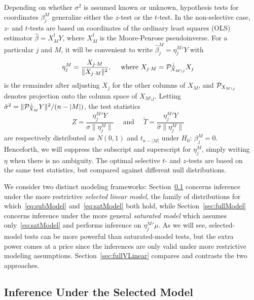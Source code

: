 \documentclass{article}
\theoremstyle{definition}
\newcommand{\bX}{X}
\newcommand{\proj}{\cP}
\begin{document}
Depending on whether $\sigma^2$ is assumed known or unknown, hypothesis tests for coordinates $\beta_j^{M}$ generalize either the $z$-test or the $t$-test. In the non-selective case, $z$- and $t$-tests are based on coordinates of the ordinary least squares (OLS) estimator $\hat\beta = \bX_M^\dagger Y$, where  $\bX_M^\dagger$ is the Moore-Penrose pseudoinverse. For a particular $j$ and $M$, it will be convenient to write $\hat\beta_j^M = {\eta_j^M}'Y$ with
\begin{equation}
  {\eta_j^M}= \frac{X_{j\cdot M}}{\|X_{j\cdot M}\|^2}, \quad \text{ where } X_{j\cdot M} = \proj_{\bX_{M\setminus j}}^\perp X_j
\end{equation}
is the remainder after adjusting $X_j$ for the other columns of $X_M$, and $\proj_{\bX_{M\setminus j}}$ denotes projection onto the column space of $\bX_{M\setminus j}$. Letting $\hat\sigma^2=\|\proj_{\bX_M}^\perp Y\|^2/(n-|M|)$, the test statistics
\begin{equation}\label{eq:testStats}
  Z = \frac{{\eta_j^M}'Y}{\sigma \|{\eta_j^M}\|} \quad \text{ and } \quad \widetilde T = \frac{{\eta_j^M}'Y}{\hat\sigma \|{\eta_j^M}\|}
\end{equation}
are respectively distributed as $N(0,1)$ and $t_{n-|M|}$ under $H_0:\, \beta_j^M = 0$. Henceforth, we will suppress the subscript and superscript for $\eta_j^M$, simply writing $\eta$ when there is no ambiguity. The optimal selective $t$- and $z$-tests are based on the same test statistics, but compared against different null distributions.

We consider two distinct modeling frameworks: Section~\ref{sec:reducedModel} concerns inference under the more restrictive {\em selected linear model}, the family of distributions for which~\eqref{eq:subModel} and~\eqref{eq:satModel} both hold, while Section~\ref{sec:fullModel} concerns inference under the more general {\em saturated model} which assumes only~\eqref{eq:satModel} and performs inference on ${\eta_j^M}'\mu$. As we will see, selected-model tests can be more powerful than saturated-model tests, but the extra power comes at a price since the inferences are only valid under more restrictive modeling assumptions. Section~\ref{sec:fullVLinear} compares and contrasts the two approaches.

\subsection{Inference Under the Selected Model}\label{sec:reducedModel}
\end{document}
